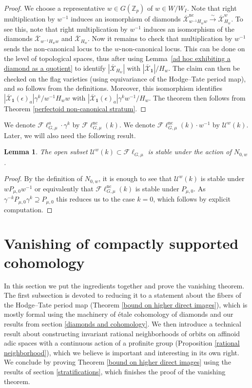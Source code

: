 \documentclass{amsart}
\newtheorem{lemma}[subsubsection]{Lemma}
\theoremstyle{remark}
\numberwithin{equation}{subsection}
\newcommand{\Z}{\ZZ}
\newcommand{\ZZ}{{\mathbb Z}}
\newcommand{\cU}{{\mathcal U}}
\newcommand{\Zp}{\Z_p}
\newcommand{\toisom}{\xrightarrow{\sim}}
\newcommand{\mbf}{\mathbf}
\newcommand{\Fl}{\mathscr{F}\!\ell}
\newcommand{\ocX}{\overline{\mathcal{X}}}
\newcommand{\nc}{\mathrm{nc}}
\renewcommand{\(}{\left(}
\renewcommand{\)}{\right)}
\begin{document}
\begin{proof} We choose a representative $w\in G(\Zp)$ of $w\in W/W_I$. Note that right multiplication by $w^{-1}$ induces an isomorphism of diamonds $ \ocX^{\mathrm{nc}}_{w^{-1}H_w w} \toisom \ocX^{w}_{H_w}$. To see this, note that right multiplication by $w^{-1}$ induces an isomorphism of the 
diamonds $\ocX_{w^{-1}H_w w}$ and $\ocX_{H_w}$. 
Now it remains to check that multiplication by $w^{-1}$ sends the non-canonical locus to the $w$-non-canonical locus. 
This can be done on the level of topological spaces, thus after using Lemma~\ref{ad hoc exhibiting a diamond as a quotient} 
to identify $|\ocX_{H_w}|$ with $|\ocX_{\mbf{1}}|/H_w$. The claim can then be checked on the flag varieties (using equivariance of the Hodge--Tate period map), and so follows from the definitions. Moreover, this isomorphism identifies $|\ocX_{\mbf{1}}(\epsilon)_{a}|\gamma^{k}/w^{-1}H_w w$ with $|\ocX_{\mbf{1}}(\epsilon)_{a}|\gamma^{k}w^{-1}/H_w$. The theorem then follows from Theorem \ref{perfectoid non-canonical stratum}.  
\end{proof}

\noindent We denote $\Fl_{G,\mu}^{a}\cdot\gamma^{k}$ by $\Fl_{G,\mu}^{\nc}(k)$. We denote $\Fl_{G,\mu}^{\nc}(k)\cdot w^{-1}$ by $\cU^w(k)$. Later, we will also need the following result. 

\begin{lemma}\label{standard neighborhoods are stable} The open subset $\cU^w(k)\subset \Fl_{G,\mu}$ is stable under the action of $N_{0,w}$. 
\end{lemma}

\begin{proof} By the definition of $N_{0,w}$, it is enough to see that $\cU^w(k)$ is stable under $w P_{\mu,0}w^{-1}$ or equivalently that $\Fl_{G,\mu}^{\nc}(k)$ is stable under $P_{\mu,0}$. As $\gamma^{-k}P_{\mu,0}\gamma^{k} \supseteq P_{\mu,0}$ this reduces us to the case $k=0$, which follows by explicit computation.
\end{proof}

\section{Vanishing of compactly supported cohomology}\label{vanishing}

In this section we put the ingredients together and prove the vanishing theorem. The first subsection is devoted to reducing it to a statement about the fibers of the Hodge--Tate period map (Theorem \ref{bound on higher direct images}), which is mostly formal using the machinery of \'etale cohomology of diamonds and our results from section \ref{diamonds and cohomology}. We then introduce a technical result about constructing invariant rational neighborhoods of orbits on affinoid adic spaces with a continuous action of a profinite group (Proposition \ref{rational neighborhood}), which we believe is important and interesting in its own right. We conclude by proving Theorem \ref{bound on higher direct images} using the results of section \ref{stratifications}, which finishes the proof of the vanishing theorem.
\end{document}
